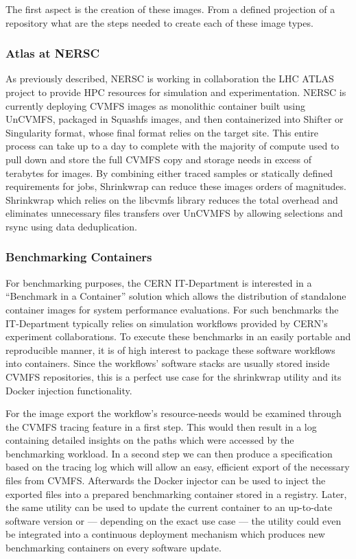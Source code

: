 \documentclass[sigconf]{acmart}
\begin{document}

The first aspect is the creation of these images.
From a defined projection of a repository
what are the steps needed to create each of these image types.

\subsubsection{Atlas at NERSC}

As previously described, NERSC is working in collaboration the LHC ATLAS project
to provide HPC resources for simulation and experimentation.
NERSC is currently deploying CVMFS images as monolithic container 
built using UnCVMFS, packaged in Squashfs images, and then containerized 
into Shifter or Singularity format, whose final format
relies on the target site.
This entire process can take up to a day to complete with the majority
of compute used to pull down and store the full CVMFS copy and storage
needs in excess of terabytes for images.
By combining either traced samples or statically defined requirements for 
jobs, Shrinkwrap can reduce these images orders of magnitudes.
Shrinkwrap which relies on the libcvmfs library reduces 
the total overhead and eliminates unnecessary files transfers
over UnCVMFS by allowing selections and rsync using data deduplication.

\subsubsection{Benchmarking Containers}
For benchmarking purposes, the CERN IT-Department is interested in a ``Benchmark in a Container'' solution which allows the distribution of standalone container images for system performance evaluations. For such benchmarks the IT-Department typically relies on simulation workflows provided by CERN's experiment collaborations. To execute these benchmarks in an easily portable and reproducible manner, it is of high interest to package these software workflows into containers. Since the workflows' software stacks are usually stored inside CVMFS repositories, this is a perfect use case for the shrinkwrap utility and its Docker injection functionality.

For the image export the workflow’s resource-needs would be examined through the CVMFS tracing feature in a first step. This would then result in a log containing detailed insights on the paths which were accessed by the benchmarking workload. In a second step we can then produce a specification based on the tracing log which will allow an easy, efficient export of the necessary files from CVMFS. Afterwards the Docker injector can be used to inject the exported files into a prepared benchmarking container stored in a registry. Later, the same utility can be used to update the current container to an up-to-date software version or — depending on the exact use case — the utility could even be integrated into a continuous deployment mechanism which produces new benchmarking containers on every software update.
\end{document}
